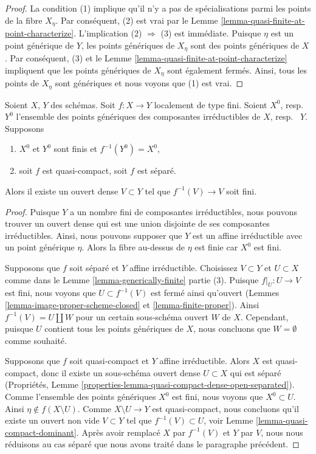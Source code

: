 \begin{proof}
La condition (1) implique qu'il n'y a pas de spécialisations parmi les points
de la fibre $X_\eta$. Par conséquent, (2)
est vrai par le Lemme \ref{lemma-quasi-finite-at-point-characterize}. L'implication (2) $\Rightarrow$
(3) est immédiate. Puisque $\eta$ est un point
générique de $Y$, les points génériques de $X_\eta$ sont des points
génériques de $X$. Par conséquent,
(3) et le Lemme \ref{lemma-quasi-finite-at-point-characterize} impliquent que les points génériques
de $X_\eta$ sont également fermés. Ainsi, tous les
points de $X_\eta$ sont génériques et nous voyons que (1) est vrai.
\end{proof}

\begin{lemma}
\label{lemma-finite-over-dense-open}
Soient $X$, $Y$ des schémas. Soit $f : X \to Y$ localement de type fini. Soient $X^0$,
resp. \ $Y^0$ l'ensemble des points génériques des composantes irréductibles de
$X$, resp. \ $Y$. Supposons
\begin{enumerate}
\item $X^0$ et $Y^0$ sont finis et $f^{-1}(Y^0) = X^0$,
\item soit $f$ est quasi-compact, soit $f$ est séparé.
\end{enumerate}
Alors il existe un ouvert dense $V \subset Y$
tel que $f^{-1}(V) \to V$ soit fini.
\end{lemma}

\begin{proof}
Puisque $Y$ a un nombre fini de composantes irréductibles, nous pouvons trouver un ouvert
dense qui est une union disjointe de ses composantes irréductibles. Ainsi, nous pouvons supposer
que $Y$ est un affine irréductible avec un point générique $\eta$. Alors la fibre au-dessus
de $\eta$ est finie car $X^0$ est fini.

\medskip\noindent
Supposons que $f$ soit séparé et $Y$ affine irréductible.
Choisissez $V \subset Y$ et $U \subset X$ comme dans le Lemme \ref{lemma-generically-finite} partie
(3). Puisque $f|_U : U \to V$ est fini, nous voyons que $U \subset f^{-1}(V)$
est fermé ainsi qu'ouvert (Lemmes \ref{lemma-image-proper-scheme-closed} et \ref{lemma-finite-proper}). Ainsi $f^{-1}(V) = U \amalg W$
pour un certain sous-schéma ouvert $W$ de $X$. Cependant,
puisque $U$ contient tous les points génériques de $X$,
nous concluons que $W = \emptyset$ comme souhaité.

\medskip\noindent
Supposons que $f$ soit quasi-compact et $Y$ affine
irréductible. Alors $X$ est quasi-compact, donc il existe
un sous-schéma ouvert
dense $U \subset X$ qui est séparé (Propriétés, Lemme \ref{properties-lemma-quasi-compact-dense-open-separated}). Comme
l'ensemble des points génériques $X^0$ est fini, nous voyons que $X^0 \subset U$.
Ainsi $\eta \not \in f(X \setminus U)$. Comme $X \setminus U \to Y$ est quasi-compact, nous
concluons qu'il existe un ouvert non vide $V \subset Y$ tel que $f^{-1}(V) \subset U$,
voir Lemme \ref{lemma-quasi-compact-dominant}. Après avoir remplacé $X$ par $f^{-1}(V)$
et $Y$ par $V$, nous nous réduisons au cas
séparé que nous avons traité dans le paragraphe précédent.
\end{proof}


